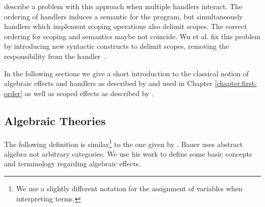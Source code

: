 \textcite{DBLP:conf/haskell/WuSH14} describe a problem with this approach when
multiple handlers interact.
The ordering of handlers induces a semantic for the program, but simultaneously
handlers which implement scoping operations also delimit scopes.
The correct ordering for scoping and semantics maybe not coincide.
Wu et al. fix this problem by introducing new syntactic constructs to delimit
scopes, removing the responsibility from the
handler~\cite{DBLP:conf/haskell/WuSH14,DBLP:conf/lics/PirogSWJ18}.

In the following sections we give a short introduction to the classical notion
of algebraic effects and handlers as described by
\textcite{DBLP:journals/corr/abs-1807-05923} and used in Chapter
\ref{chapter:first-order} as well as scoped effects as described by
\textcite{DBLP:conf/haskell/WuSH14}.

\subsection{Algebraic Theories}

The following definition is similar\footnote{We use a slightly different
  notation for the assignment of variables when interpreting terms.} to the one
given by \textcite{DBLP:journals/corr/abs-1807-05923}.
Bauer uses abstract algebra not arbitrary categories.
We use his work to define some basic concepts and terminology regarding
algebraic effects.

